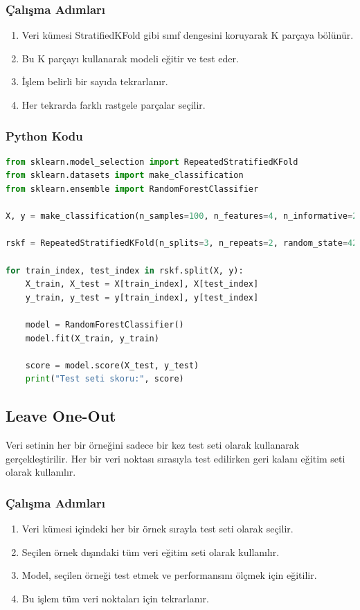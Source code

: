 \subsubsection{Çalışma Adımları}
\begin{enumerate}
    \item Veri kümesi StratifiedKFold gibi sınıf dengesini koruyarak K parçaya bölünür.
    \item Bu K parçayı kullanarak modeli eğitir ve test eder.
    \item İşlem belirli bir sayıda tekrarlanır.
    \item Her tekrarda farklı rastgele parçalar seçilir.
\end{enumerate}

\subsubsection{Python Kodu}

\begin{lstlisting}[language=Python, caption=Scikit-learn'de Repeated Stratified KFold örneği.]
from sklearn.model_selection import RepeatedStratifiedKFold
from sklearn.datasets import make_classification
from sklearn.ensemble import RandomForestClassifier

X, y = make_classification(n_samples=100, n_features=4, n_informative=2, n_redundant=0, random_state=42, n_classes=2)

rskf = RepeatedStratifiedKFold(n_splits=3, n_repeats=2, random_state=42)

for train_index, test_index in rskf.split(X, y):
    X_train, X_test = X[train_index], X[test_index]
    y_train, y_test = y[train_index], y[test_index]
    
    model = RandomForestClassifier()
    model.fit(X_train, y_train)
    
    score = model.score(X_test, y_test)
    print("Test seti skoru:", score)
\end{lstlisting}

\newpage

\subsection{Leave One-Out}
Veri setinin her bir örneğini sadece bir kez test seti olarak kullanarak gerçekleştirilir. Her bir veri noktası sırasıyla test edilirken geri kalanı eğitim seti olarak kullanılır.

\subsubsection{Çalışma Adımları}
\begin{enumerate}
    \item Veri kümesi içindeki her bir örnek sırayla test seti olarak seçilir.
    \item Seçilen örnek dışındaki tüm veri eğitim seti olarak kullanılır.
    \item Model, seçilen örneği test etmek ve performansını ölçmek için eğitilir.
    \item Bu işlem tüm veri noktaları için tekrarlanır.
\end{enumerate}

